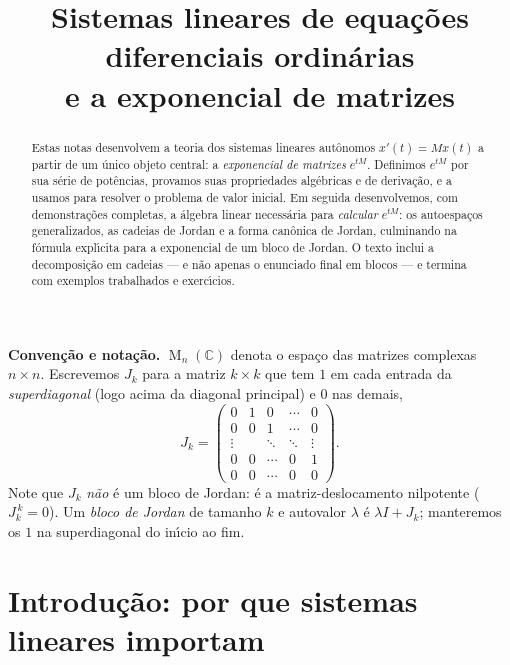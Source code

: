 \documentclass[11pt,a4paper]{amsart}
\title[Sistemas lineares de EDOs e a exponencial de matrizes]{Sistemas lineares
de equa\c{c}\~oes diferenciais ordin\'arias\\ e a exponencial de matrizes}
\author{}
\date{}
\newcommand{\C}{\mathbb{C}}
\DeclareMathOperator{\Mat}{M}
\theoremstyle{plain}
\theoremstyle{definition}
\theoremstyle{remark}
\begin{document}
\begin{abstract}
Estas notas desenvolvem a teoria dos sistemas lineares aut\^onomos
$x'(t)=Mx(t)$ a partir de um \'unico objeto central: a \emph{exponencial de
matrizes} $e^{tM}$. Definimos $e^{tM}$ por sua s\'erie de pot\^encias, provamos
suas propriedades alg\'ebricas e de deriva\c{c}\~ao, e a usamos para resolver o
problema de valor inicial. Em seguida desenvolvemos, com demonstra\c{c}\~oes
completas, a \'algebra linear necess\'aria para \emph{calcular} $e^{tM}$: os
autoespa\c{c}os generalizados, as cadeias de Jordan e a forma can\^onica de
Jordan, culminando na f\'ormula expl\'\i cita para a exponencial de um bloco de
Jordan. O texto inclui a decomposi\c{c}\~ao em cadeias --- e n\~ao apenas o
enunciado final em blocos --- e termina com exemplos trabalhados e
exerc\'\i cios.
\end{abstract}

\maketitle


\vspace{2mm}
{\small\noindent\textbf{Conven\c{c}\~ao e nota\c{c}\~ao.} $\Mat_n(\C)$ denota o
espa\c{c}o das matrizes complexas $n\times n$. Escrevemos $J_k$ para a
matriz $k\times k$ que tem $1$ em cada entrada da \emph{superdiagonal} (logo
acima da diagonal principal) e $0$ nas demais,
\[
  J_k=\begin{pmatrix}
        0 & 1 & 0 & \cdots & 0\\
        0 & 0 & 1 & \cdots & 0\\
        \vdots & & \ddots & \ddots & \vdots\\
        0 & 0 & \cdots & 0 & 1\\
        0 & 0 & \cdots & 0 & 0
      \end{pmatrix}.
\]
Note que $J_k$ \emph{n\~ao} \'e um bloco de Jordan: \'e a matriz-deslocamento
nilpotente ($J_k^{\,k}=0$). Um \emph{bloco de Jordan} de tamanho $k$ e autovalor
$\lambda$ \'e $\lambda I + J_k$; manteremos os $1$ na superdiagonal do
in\'\i cio ao fim.}

\vspace{3mm}

\section{Introdu\c{c}\~ao: por que sistemas lineares importam}
\end{document}
